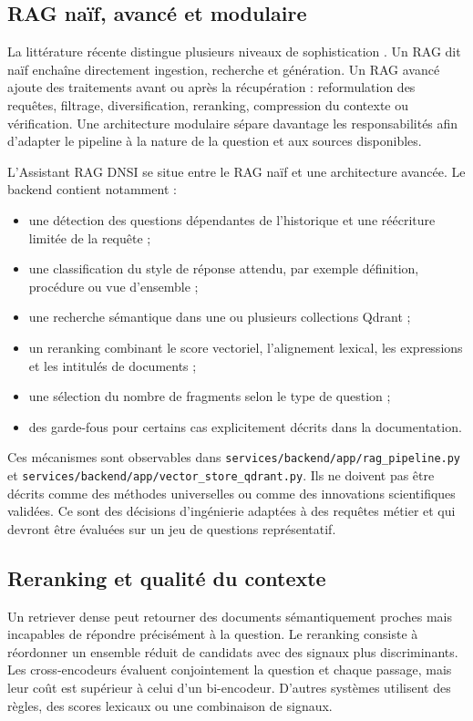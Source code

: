 \subsection{RAG naïf, avancé et modulaire}

La littérature récente distingue plusieurs niveaux de sophistication \citep{Gao2024RAGSurvey}. Un RAG dit naïf enchaîne directement ingestion, recherche et génération. Un RAG avancé ajoute des traitements avant ou après la récupération : reformulation des requêtes, filtrage, diversification, reranking, compression du contexte ou vérification. Une architecture modulaire sépare davantage les responsabilités afin d'adapter le pipeline à la nature de la question et aux sources disponibles.

L'Assistant RAG DNSI se situe entre le RAG naïf et une architecture avancée. Le backend contient notamment :

\begin{itemize}
    \item une détection des questions dépendantes de l'historique et une réécriture limitée de la requête ;
    \item une classification du style de réponse attendu, par exemple définition, procédure ou vue d'ensemble ;
    \item une recherche sémantique dans une ou plusieurs collections Qdrant ;
    \item un reranking combinant le score vectoriel, l'alignement lexical, les expressions et les intitulés de documents ;
    \item une sélection du nombre de fragments selon le type de question ;
    \item des garde-fous pour certains cas explicitement décrits dans la documentation.
\end{itemize}

Ces mécanismes sont observables dans \texttt{services/backend/app/rag\_pipeline.py} et \texttt{services/backend/app/vector\_store\_qdrant.py}. Ils ne doivent pas être décrits comme des méthodes universelles ou comme des innovations scientifiques validées. Ce sont des décisions d'ingénierie adaptées à des requêtes métier et qui devront être évaluées sur un jeu de questions représentatif.

\subsection{Reranking et qualité du contexte}

Un retriever dense peut retourner des documents sémantiquement proches mais incapables de répondre précisément à la question. Le reranking consiste à réordonner un ensemble réduit de candidats avec des signaux plus discriminants. Les cross-encodeurs évaluent conjointement la question et chaque passage, mais leur coût est supérieur à celui d'un bi-encodeur. D'autres systèmes utilisent des règles, des scores lexicaux ou une combinaison de signaux.

